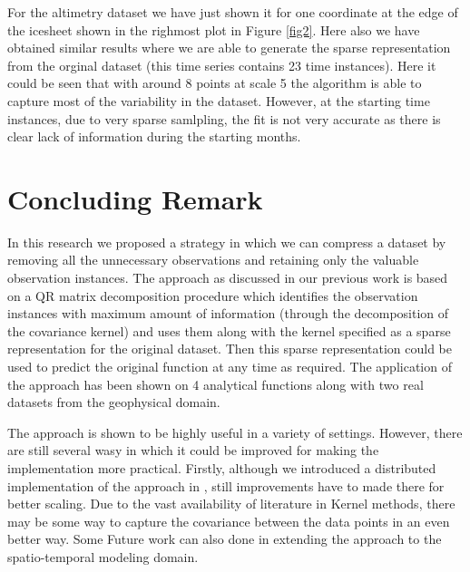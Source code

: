 \documentclass[procedia]{easychair}
\begin{document}
For the altimetry dataset we have just shown it for one coordinate at the edge of the icesheet shown in the righmost plot in Figure \ref{fig2}. Here also we have obtained similar results where we are able to generate the sparse representation from the orginal dataset (this time series contains 23 time instances). Here it could be seen that with around 8 points at scale 5 the algorithm is able to capture most of the variability in the dataset. However, at the starting time instances, due to very sparse samlpling, the fit is not very accurate as there is clear lack of information during the starting months.

\section{Concluding Remark} 

In this research we proposed a strategy in which we can compress a dataset by removing all the unnecessary observations and retaining only the valuable observation instances. The approach as discussed in our previous work \cite{patra2016multilevel} is based on a QR matrix decomposition procedure which identifies the observation instances with maximum amount of information (through the decomposition of the covariance kernel) and uses them along with the kernel specified as a sparse representation for the original dataset. Then this sparse representation could be used to predict the original function at any time as required. The application of the approach has been shown on 4 analytical functions along with two real datasets from the geophysical domain. 

 The approach is shown to be highly useful in a variety of settings. However, there are still several wasy in which it could be improved for making the implementation more practical. Firstly, although we introduced a distributed implementation of the approach in \cite{patra2016multilevel}, still improvements have to made there for better scaling. Due to the vast availability of literature in Kernel methods, there may be some way to capture the covariance between the data points in an even better way. Some Future work can also  done in extending the approach to the spatio-temporal modeling domain.



















































\end{document}
